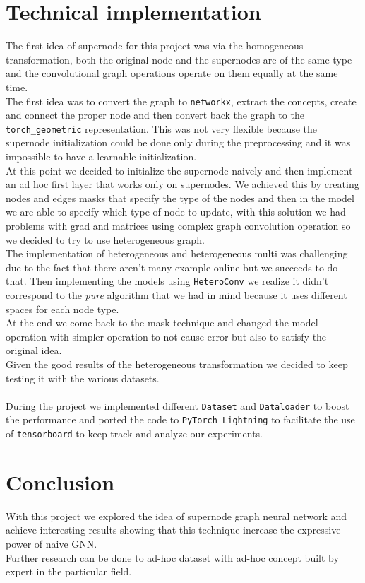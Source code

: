 \documentclass[twoside,11pt]{article}
\begin{document}
\section{Technical implementation}
The first idea of supernode for this project was via the homogeneous transformation, both the original node and the supernodes are of the same type and the convolutional graph operations operate on them equally at the same time.\\ The first idea was to convert the graph to \texttt{networkx}, extract the concepts, create and connect the proper node and then convert back the graph to the \texttt{torch\_geometric} representation. This was not very flexible because the supernode initialization could be done only during the preprocessing and it was impossible to have a learnable initialization.\\
At this point we decided to initialize the supernode naively and then implement an ad hoc first layer that works only on supernodes. We achieved this by creating nodes and edges masks that specify the type of the nodes and then in the model we are able to specify which type of node to update, with this solution we had problems with grad and matrices using complex graph convolution operation so we decided to try to use heterogeneous graph.\\
The implementation of heterogeneous and heterogeneous multi was challenging due to the fact that there aren't many example online but we succeeds to do that.
Then implementing the models using \texttt{HeteroConv} we realize it didn't correspond to the \textit{pure} algorithm that we had in mind because it uses different spaces for each node type.\\
At the end we come back to the mask technique and changed the model operation with simpler operation to not cause error but also to satisfy the original idea.\\
Given the good results of the heterogeneous transformation we decided to keep testing it with the various datasets.\\\\
During the project we implemented different \texttt{Dataset} and \texttt{Dataloader} to boost the performance and ported the code to \texttt{PyTorch Lightning} to facilitate the use of \texttt{tensorboard} to keep track and analyze our experiments.

\section{Conclusion}
With this project we explored the idea of supernode graph neural network and achieve interesting results showing that this technique increase the expressive power of naive GNN.\\
Further research can be done to ad-hoc dataset with ad-hoc concept built by expert in the particular field.
\end{document}
